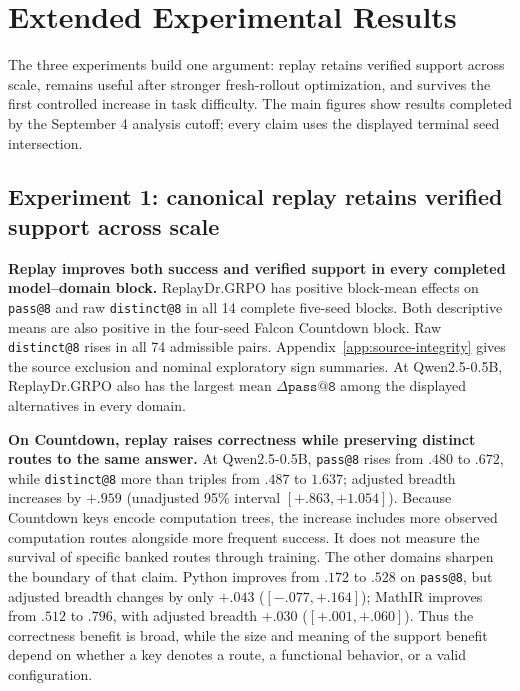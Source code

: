 \section{Extended Experimental Results}
\label{app:extended-results}

The three experiments build one argument: replay retains verified support
across scale, remains useful after stronger fresh-rollout optimization, and
survives the first controlled increase in task difficulty. The main figures
show results completed by the September 4 analysis cutoff; every claim uses
the displayed terminal seed intersection.

\subsection{Experiment 1: canonical replay retains verified support across scale}
\label{app:results-retention}

\textbf{Replay improves both success and verified support in every completed
model--domain block.} ReplayDr.GRPO has positive block-mean effects on
\texttt{pass@8} and raw \texttt{distinct@8} in all 14 complete five-seed
blocks. Both descriptive means are also positive in the four-seed Falcon
Countdown block. Raw \texttt{distinct@8} rises in all 74 admissible pairs.
Appendix~\ref{app:source-integrity} gives the source exclusion and nominal
exploratory sign summaries. At
Qwen2.5-0.5B, ReplayDr.GRPO also has the largest mean
\(\Delta\texttt{pass@8}\) among the displayed alternatives in every domain.

\textbf{On Countdown, replay raises correctness while preserving distinct
routes to the same answer.} At Qwen2.5-0.5B, \texttt{pass@8} rises from
\(.480\) to \(.672\), while \texttt{distinct@8} more than triples from
\(.487\) to \(1.637\); adjusted breadth increases by \(+.959\)
(unadjusted 95\% interval \([+.863,+1.054]\)). Because Countdown keys encode
computation trees, the increase includes more observed computation routes
alongside more frequent success. It does not measure the survival of specific
banked routes through training. The other
domains sharpen the boundary of that claim. Python improves from \(.172\) to
\(.528\) on \texttt{pass@8}, but adjusted breadth changes by only \(+.043\)
(\([-.077,+.164]\)); MathIR improves from \(.512\) to \(.796\), with
adjusted breadth \(+.030\) (\([+.001,+.060]\)). Thus the correctness benefit
is broad, while the size and meaning of the support benefit depend on whether a
key denotes a route, a functional behavior, or a valid configuration.

